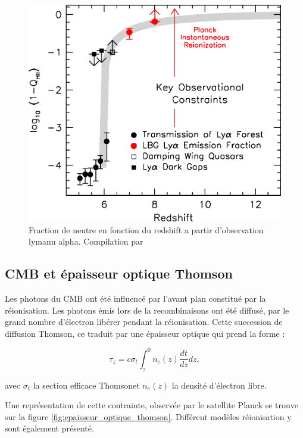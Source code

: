\begin{figure}[bth]
        \includegraphics[width=.95\linewidth]{img/01/xionconstrains.jpg} 
        \caption{Fraction de neutre en fonction du redshift a partir d'observation lymann alpha.
        Compilation par \cite{2015ApJ...811..140B}}
 		\label{fig:compile_constrains}
\end{figure}




\subsection{CMB et épaisseur optique Thomson}


Les photons du CMB ont été influencé par l'avant plan constitué par la réionisation.
Les photons émis lors de la recombinaisons ont été diffusé, par le grand nombre d'électron libérer pendant la réionisation.
Cette succession de diffusion Thomson, ce traduit par une épaisseur optique qui prend la forme : 

\begin{equation}
\tau_z = c \sigma_t \int_z^0 n_e (z) \frac{dt}{dz} dz,
\end{equation}

avec $\sigma_t$ la section efficace Thomsonet $n_e (z)$ la densité d'électron libre.

Une représentation de cette contrainte, observée par le satellite Planck se trouve sur la figure \ref{fig:epaisseur_optique_thomson}.
Différent modèles réionisation y sont également présenté.



